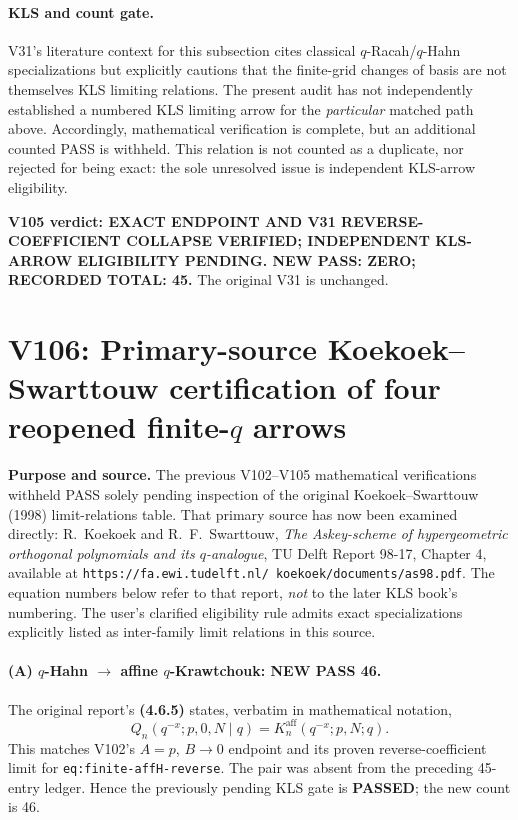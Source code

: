 \documentclass[11pt]{article}
\begin{document}
\paragraph{KLS and count gate.} V31's literature context for this subsection cites classical $q$-Racah/$q$-Hahn specializations but explicitly cautions that the finite-grid changes of basis are not themselves KLS limiting relations. The present audit has not independently established a numbered KLS limiting arrow for the \emph{particular} matched path above. Accordingly, mathematical verification is complete, but an additional counted PASS is withheld. This relation is not counted as a duplicate, nor rejected for being exact: the sole unresolved issue is independent KLS-arrow eligibility.

\noindent\textbf{V105 verdict: EXACT ENDPOINT AND V31 REVERSE-COEFFICIENT COLLAPSE VERIFIED; INDEPENDENT KLS-ARROW ELIGIBILITY PENDING. NEW PASS: ZERO; RECORDED TOTAL: 45.} The original V31 is unchanged.



\clearpage
\section{V106: Primary-source Koekoek--Swarttouw certification of four reopened finite-$q$ arrows}
\noindent\textbf{Purpose and source.} The previous V102--V105 mathematical verifications withheld PASS solely pending inspection of the original Koekoek--Swarttouw (1998) limit-relations table. That primary source has now been examined directly: R.~Koekoek and R.~F.~Swarttouw, \emph{The Askey-scheme of hypergeometric orthogonal polynomials and its $q$-analogue}, TU Delft Report 98-17, Chapter 4, available at
\texttt{https://fa.ewi.tudelft.nl/\string~koekoek/documents/as98.pdf}.
The equation numbers below refer to that report, \emph{not} to the later KLS book's numbering. The user's clarified eligibility rule admits exact specializations explicitly listed as inter-family limit relations in this source.

\paragraph{(A) $q$-Hahn $\to$ affine $q$-Krawtchouk: NEW PASS 46.}
The original report's \textbf{(4.6.5)} states, verbatim in mathematical notation,
\[
 Q_n(q^{-x};p,0,N\mid q)=K_n^{\mathrm{aff}}(q^{-x};p,N;q).
\]
This matches V102's $A=p$, $B\to0$ endpoint and its proven reverse-coefficient limit for \texttt{eq:finite-affH-reverse}. The pair was absent from the preceding 45-entry ledger. Hence the previously pending KLS gate is \textbf{PASSED}; the new count is 46.
\end{document}
